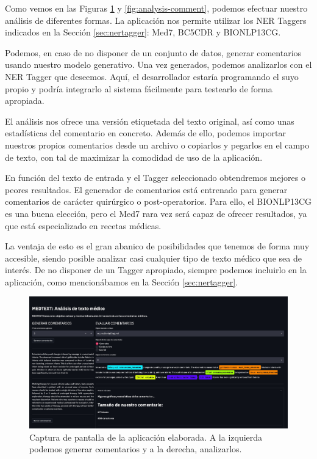 Como vemos en las Figuras \ref{fig:app-demo} y \ref{fig:analysis-comment}, podemos efectuar nuestro análisis de diferentes formas. La aplicación nos permite utilizar los NER Taggers indicados en la Sección \ref{sec:nertagger}: Med7, BC5CDR y BIONLP13CG.

Podemos, en caso de no disponer de un conjunto de datos, generar comentarios usando nuestro modelo generativo. Una vez generados, podemos analizarlos con el NER Tagger que deseemos. Aquí, el desarrollador estaría programando el suyo propio y podría integrarlo al sistema fácilmente para testearlo de forma apropiada. 

El análisis nos ofrece una versión etiquetada del texto original, así como unas estadísticas del comentario en concreto. Además de ello, podemos importar nuestros propios comentarios desde un archivo o copiarlos y pegarlos en el campo de texto, con tal de maximizar la comodidad de uso de la aplicación.

En función del texto de entrada y el Tagger seleccionado obtendremos mejores o peores resultados. El generador de comentarios está entrenado para generar comentarios de carácter quirúrgico o post-operatorios. Para ello, el BIONLP13CG es una buena elección, pero el Med7 rara vez será capaz de ofrecer resultados, ya que está especializado en recetas médicas.

La ventaja de esto es el gran abanico de posibilidades que tenemos de forma muy accesible, siendo posible analizar casi cualquier tipo de texto médico que sea de interés. De no disponer de un Tagger apropiado, siempre podemos incluirlo en la aplicación, como mencionábamos en la Sección \ref{sec:nertagger}.

\begin{figure}[h]
	\centering
	\includegraphics[width=.9\textwidth]{media/app_demo.jpeg}
	\caption{Captura de pantalla de la aplicación elaborada. A la izquierda podemos generar comentarios y a la derecha, analizarlos.}
	\label{fig:app-demo}
\end{figure}


